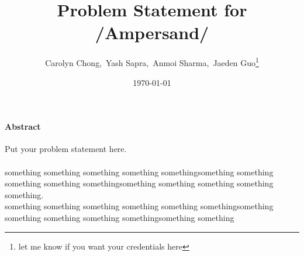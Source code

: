 \documentclass[12pt]{article}
\begin{document}
\title{Problem Statement for /Ampersand/} 
\author{Carolyn Chong,\ Yash Sapra,\ Anmoi Sharma,\ Jaeden Guo\footnote{let me know if you want your credentials here}}
\date{\today}
	
\maketitle
\paragraph*{Abstract}
Put your problem statement here.\\ \\
\indent something something something something somethingsomething something something something somethingsomething something something something something.\\ 
\indent something something something something something somethingsomething something something something somethingsomething something
\end{document}
